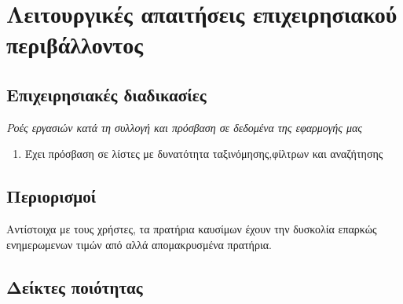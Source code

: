 \section{Λειτουργικές απαιτήσεις επιχειρησιακού περιβάλλοντος}



\subsection{Επιχειρησιακές διαδικασίες}

\textit{Ροές εργασιών κατά τη συλλογή και πρόσβαση σε δεδομένα της εφαρμογής μας}

\begin{enumerate}
	\item Έχει πρόσβαση σε λίστες με δυνατότητα ταξινόμησης,φίλτρων και αναζήτησης 
\end{enumerate}

\subsection{Περιορισμοί}
Αντίστοιχα με τους χρήστες, τα πρατήρια καυσίμων έχουν την δυσκολία επαρκώς ενημερωμενων τιμών από αλλά απομακρυσμένα πρατήρια.

\subsection{Δείκτες ποιότητας}

